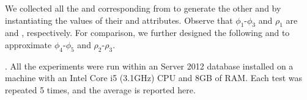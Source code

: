 We collected all the  and corresponding  from \dblp to generate the other \pCFDs and \pCINDs by instantiating the values of their  and  attributes. Observe that $\phi_1$-$\phi_3$ and $\rho _1$ are \CFDs and \CINDs, respectively. For comparison,  we further designed the following \CFDs and \CINDs to approximate $\phi_4$-$\phi_5$ and $\rho_2$-$\rho_3$.

\begin{footnotesize}
\end{footnotesize}


. All the experiments were run within an \SQL Server 2012 database installed on a machine with an Intel Core i5 (3.1GHz) CPU and 8GB of RAM. Each test was repeated 5 times, and the average is reported here.

